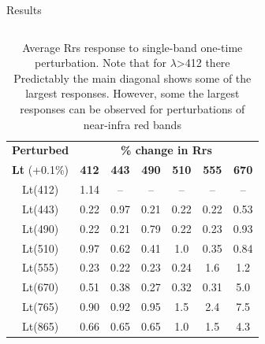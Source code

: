 \documentclass[final]{beamer}
\newlength{\onecolwid}
\newlength{\twocolwid}
\begin{document}
\begin{frame}[t]
\begin{columns}[t]
\begin{column}{\twocolwid}
\begin{block}{Results}
\begin{columns}[t,totalwidth=\twocolwid]
\begin{column}{\onecolwid}
\begin{table}
\centering
\vspace{2ex}
\begin{tabular}{|*{7}{c|}}
\toprule
\textbf{Perturbed} & \multicolumn{6}{|c|}{\textbf{\% change in Rrs}}\\
\cline{2-7}
\textbf{Lt} (+0.1\%) & \textbf{412} & \textbf{443} & \textbf{490} & \textbf{510} & \textbf{555} & \textbf{670}\\
\midrule
Lt(412) &  1.14 & -- & -- & -- & -- & --\\  
Lt(443) & 0.22 & 0.97 & 0.21 & 0.22 & 0.22 &  0.53\\
Lt(490) & 0.22 & 0.21 & 0.79 & 0.22 & 0.23 &  0.93\\
Lt(510) & 0.97 & 0.62 & 0.41 &  1.0 & 0.35 & 0.84\\
Lt(555) & 0.23 & 0.22 & 0.23 & 0.24 & 1.6 & 1.2\\
Lt(670) & 0.51 & 0.38 & 0.27 & 0.32 & 0.31 &  5.0\\
Lt(765) & 0.90 & 0.92 & 0.95 &  1.5 &  2.4 &  7.5\\
Lt(865) & 0.66 & 0.65 & 0.65 &  1.0 &  1.5 &  4.3\\
\bottomrule
\end{tabular}
\caption{Average Rrs response to single-band one-time perturbation. Note that for  $\lambda$>412 there  Predictably the main diagonal shows some of the largest responses. However, some the largest responses can be observed for perturbations of near-infra red bands}
\end{table}

\end{column} 

\begin{column}{\onecolwid}\vspace{-.6in} %


\end{column}
\end{columns}
\end{block}
\end{column}
\end{columns}
\end{frame}
\end{document}
